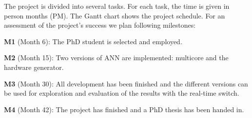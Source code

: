 \documentclass[fleqn,12pt]{article}
\begin{document}
The project is divided into several tasks.
For each task, the time is given in person months (PM). The Gantt chart shows
the project schedule.
For an assessment of the project's success we plan following milestones:

\textbf{M1} (Month 6): The PhD student is selected and employed.

\textbf{M2} (Month 15): Two versions of ANN are implemented: multicore and the
hardware generator.

\textbf{M3} (Month 30): All development has been finished and the different versions
can be used for exploration and evaluation of the results with the real-time switch.

\textbf{M4} (Month 42): The project has finished and a PhD thesis has been handed in.
\end{document}
